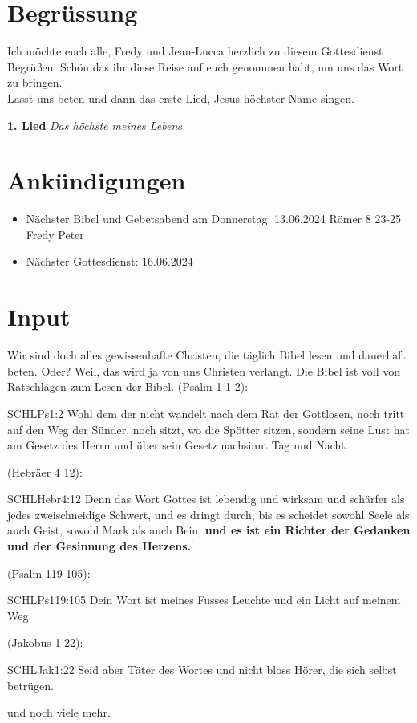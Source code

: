 

\section{Begrüssung}
Ich möchte euch alle, Fredy und Jean-Lucca herzlich zu diesem Gottesdienst Begrüßen. Schön das ihr diese Reise auf euch genommen habt, um uns das Wort zu bringen. \\Lasst uns beten und dann das erste Lied, Jesus höchster Name singen.

\textbf{1. Lied}
\textit{Das höchste meines Lebens}

\section{Ankündigungen}
\begin{itemize}
    \item Nächster Bibel und Gebetsabend am Donnerstag: 
13.06.2024 Römer 8 23-25 Fredy Peter
    \item Nächster Gottesdienst: 16.06.2024 
\end{itemize}

\section{ Input }

Wir sind doch alles gewissenhafte Christen, die täglich Bibel lesen und dauerhaft beten. Oder? Weil, das wird ja von uns Christen verlangt. Die Bibel ist voll von Ratschlägen zum Lesen der Bibel. 
(Psalm 1 1-2):
\begin{bibelbox}{SCHL}{Ps}{1:2}
Wohl dem der nicht wandelt nach dem Rat der Gottlosen, noch tritt auf den Weg der Sünder, noch sitzt, wo die Spötter sitzen, sondern seine Lust hat am Gesetz des Herrn und über sein Gesetz nachsinnt Tag und Nacht.
\end{bibelbox}
(Hebräer 4 12):
\begin{bibelbox}{SCHL}{Hebr}{4:12}
Denn das Wort Gottes ist lebendig und wirksam und schärfer als jedes zweischneidige Schwert, und es dringt durch, bis es scheidet sowohl Seele als auch Geist, sowohl Mark als auch Bein, \textbf{und es ist ein Richter der Gedanken und der Gesinnung des Herzens.}
\end{bibelbox}
(Psalm 119 105):
\begin{bibelbox}{SCHL}{Ps}{119:105}
Dein Wort ist meines Fusses Leuchte und ein Licht auf meinem Weg.
\end{bibelbox}
(Jakobus 1 22):
\begin{bibelbox}{SCHL}{Jak}{1:22}
Seid aber Täter des Wortes und nicht bloss Hörer, die sich selbst betrügen.
\end{bibelbox}
und noch viele mehr.

